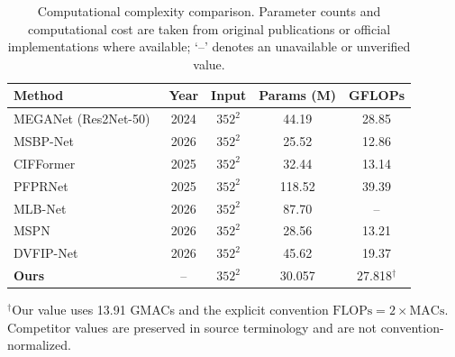 \begin{table}[htbp]
\centering
\caption{Computational complexity comparison. Parameter counts and computational cost are taken from original publications or official implementations where available; `--' denotes an unavailable or unverified value.}
\label{tab:model-complexity}
\small
\setlength{\tabcolsep}{4pt}
\renewcommand{\arraystretch}{1.1}
\begin{tabular}{lcccc}
\toprule
Method & Year & Input & Params (M) & GFLOPs \\
\midrule
MEGANet (Res2Net-50)~\cite{meganet} & 2024 & $352^2$ & 44.19 & 28.85 \\
MSBP-Net~\cite{msbpnet} & 2026 & $352^2$ & 25.52 & 12.86 \\
CIFFormer~\cite{cifformer} & 2025 & $352^2$ & 32.44 & 13.14 \\
PFPRNet~\cite{pfprnet} & 2025 & $352^2$ & 118.52 & 39.39 \\
MLB-Net~\cite{mlbnet} & 2026 & $352^2$ & 87.70 & -- \\
MSPN~\cite{mspn} & 2026 & $352^2$ & 28.56 & 13.21 \\
DVFIP-Net~\cite{dvfipnet} & 2026 & $352^2$ & 45.62 & 19.37 \\
\textbf{Ours} & -- & $352^2$ & 30.057 & 27.818$^{\dagger}$ \\
\bottomrule
\end{tabular}

\vspace{2pt}
\parbox{0.96\linewidth}{\footnotesize $^{\dagger}$Our value uses 13.91 GMACs and the explicit convention $\mathrm{FLOPs}=2\times\mathrm{MACs}$. Competitor values are preserved in source terminology and are not convention-normalized.}
\end{table}
